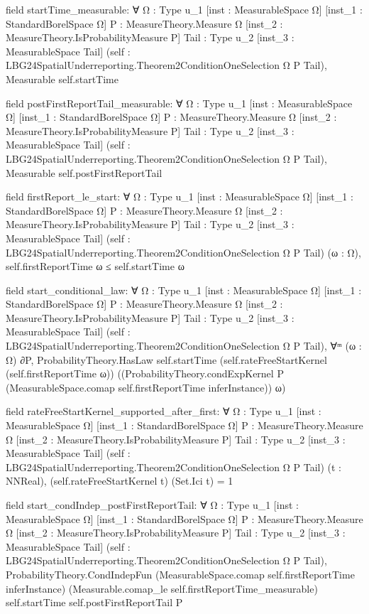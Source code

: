 \documentclass[10pt]{article}
\begin{document}
\begin{ReviewVerbatim}
field startTime_measurable:
∀ {Ω : Type u_1} [inst : MeasurableSpace Ω] [inst_1 : StandardBorelSpace Ω] {P : MeasureTheory.Measure Ω}
  [inst_2 : MeasureTheory.IsProbabilityMeasure P] {Tail : Type u_2} [inst_3 : MeasurableSpace Tail]
  (self : LBG24SpatialUnderreporting.Theorem2ConditionOneSelection Ω P Tail), Measurable self.startTime

field postFirstReportTail_measurable:
∀ {Ω : Type u_1} [inst : MeasurableSpace Ω] [inst_1 : StandardBorelSpace Ω] {P : MeasureTheory.Measure Ω}
  [inst_2 : MeasureTheory.IsProbabilityMeasure P] {Tail : Type u_2} [inst_3 : MeasurableSpace Tail]
  (self : LBG24SpatialUnderreporting.Theorem2ConditionOneSelection Ω P Tail), Measurable self.postFirstReportTail

field firstReport_le_start:
∀ {Ω : Type u_1} [inst : MeasurableSpace Ω] [inst_1 : StandardBorelSpace Ω] {P : MeasureTheory.Measure Ω}
  [inst_2 : MeasureTheory.IsProbabilityMeasure P] {Tail : Type u_2} [inst_3 : MeasurableSpace Tail]
  (self : LBG24SpatialUnderreporting.Theorem2ConditionOneSelection Ω P Tail) (ω : Ω),
  self.firstReportTime ω ≤ self.startTime ω

field start_conditional_law:
∀ {Ω : Type u_1} [inst : MeasurableSpace Ω] [inst_1 : StandardBorelSpace Ω] {P : MeasureTheory.Measure Ω}
  [inst_2 : MeasureTheory.IsProbabilityMeasure P] {Tail : Type u_2} [inst_3 : MeasurableSpace Tail]
  (self : LBG24SpatialUnderreporting.Theorem2ConditionOneSelection Ω P Tail),
  ∀ᵐ (ω : Ω) ∂P,
    ProbabilityTheory.HasLaw self.startTime (self.rateFreeStartKernel (self.firstReportTime ω))
      ((ProbabilityTheory.condExpKernel P (MeasurableSpace.comap self.firstReportTime inferInstance)) ω)

field rateFreeStartKernel_supported_after_first:
∀ {Ω : Type u_1} [inst : MeasurableSpace Ω] [inst_1 : StandardBorelSpace Ω] {P : MeasureTheory.Measure Ω}
  [inst_2 : MeasureTheory.IsProbabilityMeasure P] {Tail : Type u_2} [inst_3 : MeasurableSpace Tail]
  (self : LBG24SpatialUnderreporting.Theorem2ConditionOneSelection Ω P Tail) (t : NNReal),
  (self.rateFreeStartKernel t) (Set.Ici t) = 1

field start_condIndep_postFirstReportTail:
∀ {Ω : Type u_1} [inst : MeasurableSpace Ω] [inst_1 : StandardBorelSpace Ω] {P : MeasureTheory.Measure Ω}
  [inst_2 : MeasureTheory.IsProbabilityMeasure P] {Tail : Type u_2} [inst_3 : MeasurableSpace Tail]
  (self : LBG24SpatialUnderreporting.Theorem2ConditionOneSelection Ω P Tail),
  ProbabilityTheory.CondIndepFun (MeasurableSpace.comap self.firstReportTime inferInstance)
    (Measurable.comap_le self.firstReportTime_measurable) self.startTime self.postFirstReportTail P
\end{ReviewVerbatim}
\end{document}
